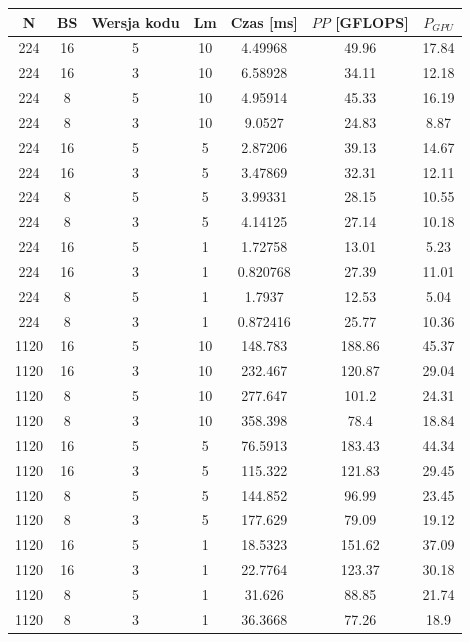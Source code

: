 \documentclass[12pt,a4paper]{article}
\begin{document}
\begin{table}[H]
\centering
\def\arraystretch{1.05}
\begin{adjustbox}{totalheight=\textheight-\baselineskip}
\begin{tabular}{|c|c|c|c|c|c|c|}
\hline
N	&	BS	&	Wersja kodu	&	Lm	&	Czas [ms]	&	$PP$ [GFLOPS]	&	$P_{GPU}$	\\ \hline
224	&	16	&	5	&	10	&	4.49968	&	49.96	&	17.84	\\ \hline
224	&	16	&	3	&	10	&	6.58928	&	34.11	&	12.18	\\ \hline
224	&	8	&	5	&	10	&	4.95914	&	45.33	&	16.19	\\ \hline
224	&	8	&	3	&	10	&	9.0527	&	24.83	&	8.87	\\ \hline
224	&	16	&	5	&	5	&	2.87206	&	39.13	&	14.67	\\ \hline
224	&	16	&	3	&	5	&	3.47869	&	32.31	&	12.11	\\ \hline
224	&	8	&	5	&	5	&	3.99331	&	28.15	&	10.55	\\ \hline
224	&	8	&	3	&	5	&	4.14125	&	27.14	&	10.18	\\ \hline
224	&	16	&	5	&	1	&	1.72758	&	13.01	&	5.23	\\ \hline
224	&	16	&	3	&	1	&	0.820768	&	27.39	&	11.01	\\ \hline
224	&	8	&	5	&	1	&	1.7937	&	12.53	&	5.04	\\ \hline
224	&	8	&	3	&	1	&	0.872416	&	25.77	&	10.36	\\ \hline
1120	&	16	&	5	&	10	&	148.783	&	188.86	&	45.37	\\ \hline
1120	&	16	&	3	&	10	&	232.467	&	120.87	&	29.04	\\ \hline
1120	&	8	&	5	&	10	&	277.647	&	101.2	&	24.31	\\ \hline
1120	&	8	&	3	&	10	&	358.398	&	78.4	&	18.84	\\ \hline
1120	&	16	&	5	&	5	&	76.5913	&	183.43	&	44.34	\\ \hline
1120	&	16	&	3	&	5	&	115.322	&	121.83	&	29.45	\\ \hline
1120	&	8	&	5	&	5	&	144.852	&	96.99	&	23.45	\\ \hline
1120	&	8	&	3	&	5	&	177.629	&	79.09	&	19.12	\\ \hline
1120	&	16	&	5	&	1	&	18.5323	&	151.62	&	37.09	\\ \hline
1120	&	16	&	3	&	1	&	22.7764	&	123.37	&	30.18	\\ \hline
1120	&	8	&	5	&	1	&	31.626	&	88.85	&	21.74	\\ \hline
1120	&	8	&	3	&	1	&	36.3668	&	77.26	&	18.9	\\ \hline

\end{tabular}
\end{adjustbox}
\end{table}
\end{document}
